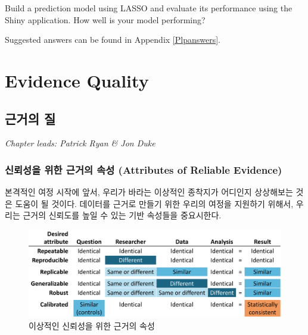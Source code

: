 \documentclass[11pt]{book}
\theoremstyle{definition}
\theoremstyle{definition}
\theoremstyle{definition}
\theoremstyle{remark}
\let\BeginKnitrBlock\begin \let\EndKnitrBlock\end
\begin{document}
\BeginKnitrBlock{exercise}
\protect\hypertarget{exr:exercisePlp3}{}{\label{exr:exercisePlp3} }Build a
prediction model using LASSO and evaluate its performance using the
Shiny application. How well is your model performing?
\EndKnitrBlock{exercise}

Suggested answers can be found in Appendix \ref{Plpanswers}.

\part{Evidence Quality}\label{part-evidence-quality}

\chapter{근거의 질}\label{EvidenceQuality}

\emph{Chapter leads: Patrick Ryan \& Jon Duke}


\section{신뢰성을 위한 근거의 속성 (Attributes of Reliable
Evidence)}\label{----attributes-of-reliable-evidence}

본격적인 여정 시작에 앞서, 우리가 바라는 이상적인 종착지가 어디인지
상상해보는 것은 도움이 될 것이다. 데이터를 근거로 만들기 위한 우리의
여정을 지원하기 위해서, 우리는 근거의 신뢰도를 높일 수 있는 기반
속성들을 중요시한다.

\begin{figure}

{\centering \includegraphics[width=1\linewidth]{images/EvidenceQuality/reliableevidenceattributes} 

}

\caption{이상적인 신뢰성을 위한 근거의 속성}\label{fig:attributesOfEvidence}
\end{figure}
\end{document}
